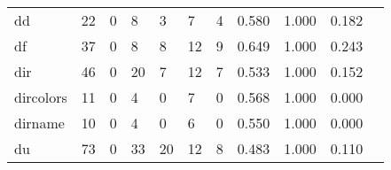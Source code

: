 \begin{longtable}{lp{1.2cm}p{1.2cm}p{1.2cm}p{1.2cm}p{1.2cm}p{1.2cm}p{1.2cm}p{1.2cm}p{1.2cm}p{1.2cm}}
dd        &                                    22 &                                                  0 &                                                  8 &                                                  3 &                                                  7 &                                                  4 &                                         0.580 &                                              1.000 &                                              0.182 \\
df        &                                    37 &                                                  0 &                                                  8 &                                                  8 &                                                 12 &                                                  9 &                                         0.649 &                                              1.000 &                                              0.243 \\
dir       &                                    46 &                                                  0 &                                                 20 &                                                  7 &                                                 12 &                                                  7 &                                         0.533 &                                              1.000 &                                              0.152 \\
dircolors &                                    11 &                                                  0 &                                                  4 &                                                  0 &                                                  7 &                                                  0 &                                         0.568 &                                              1.000 &                                              0.000 \\
dirname   &                                    10 &                                                  0 &                                                  4 &                                                  0 &                                                  6 &                                                  0 &                                         0.550 &                                              1.000 &                                              0.000 \\
du        &                                    73 &                                                  0 &                                                 33 &                                                 20 &                                                 12 &                                                  8 &                                         0.483 &                                              1.000 &                                              0.110 \\

\end{longtable}
